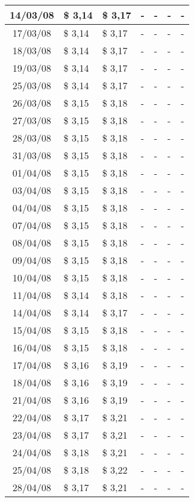 \begin{center}
\begin{longtable}{|c|p{1.5cm}|p{1.5cm}|p{1.5cm}|p{1.5cm}|p{1.5cm}|p{1.5cm}|}
14/03/08 & \$ 3,14 & \$ 3,17 & - & - & - & - \\ \hline
17/03/08 & \$ 3,14 & \$ 3,17 & - & - & - & - \\ \hline
18/03/08 & \$ 3,14 & \$ 3,17 & - & - & - & - \\ \hline
19/03/08 & \$ 3,14 & \$ 3,17 & - & - & - & - \\ \hline
25/03/08 & \$ 3,14 & \$ 3,17 & - & - & - & - \\ \hline
26/03/08 & \$ 3,15 & \$ 3,18 & - & - & - & - \\ \hline
27/03/08 & \$ 3,15 & \$ 3,18 & - & - & - & - \\ \hline
28/03/08 & \$ 3,15 & \$ 3,18 & - & - & - & - \\ \hline
31/03/08 & \$ 3,15 & \$ 3,18 & - & - & - & - \\ \hline
01/04/08 & \$ 3,15 & \$ 3,18 & - & - & - & - \\ \hline
03/04/08 & \$ 3,15 & \$ 3,18 & - & - & - & - \\ \hline
04/04/08 & \$ 3,15 & \$ 3,18 & - & - & - & - \\ \hline
07/04/08 & \$ 3,15 & \$ 3,18 & - & - & - & - \\ \hline
08/04/08 & \$ 3,15 & \$ 3,18 & - & - & - & - \\ \hline
09/04/08 & \$ 3,15 & \$ 3,18 & - & - & - & - \\ \hline
10/04/08 & \$ 3,15 & \$ 3,18 & - & - & - & - \\ \hline
11/04/08 & \$ 3,14 & \$ 3,18 & - & - & - & - \\ \hline
14/04/08 & \$ 3,14 & \$ 3,17 & - & - & - & - \\ \hline
15/04/08 & \$ 3,15 & \$ 3,18 & - & - & - & - \\ \hline
16/04/08 & \$ 3,15 & \$ 3,18 & - & - & - & - \\ \hline
17/04/08 & \$ 3,16 & \$ 3,19 & - & - & - & - \\ \hline
18/04/08 & \$ 3,16 & \$ 3,19 & - & - & - & - \\ \hline
21/04/08 & \$ 3,16 & \$ 3,19 & - & - & - & - \\ \hline
22/04/08 & \$ 3,17 & \$ 3,21 & - & - & - & - \\ \hline
23/04/08 & \$ 3,17 & \$ 3,21 & - & - & - & - \\ \hline
24/04/08 & \$ 3,18 & \$ 3,21 & - & - & - & - \\ \hline
25/04/08 & \$ 3,18 & \$ 3,22 & - & - & - & - \\ \hline
28/04/08 & \$ 3,17 & \$ 3,21 & - & - & - & - \\ \hline

\end{longtable}
\end{center}
